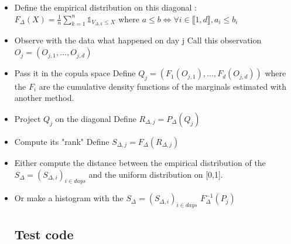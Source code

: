 \documentclass{article}
\begin{document}
\begin{itemize}
\item Define the empirical distribution on this diagonal : \newline
\newline
	\begin{math} F_\Delta (X) = \frac{1}{n} \sum_{k=1}^n \mathds{1}_{V_{\Delta ,k} \leq X} \end{math}
	\newline
	\newline
	where \begin{math} a \leq b \iff \forall i \in \llbracket 1,d \rrbracket,  a_i \leq b_i  \end{math}
	
\item Observe with the data what happened on day j \newline
		Call this observation $O_j = (O_{j,1},...,O_{j,d})$

\item Pass it in the copula space \newline
		Define \begin{math} Q_j = (F_1 (O_{j,1}),...,F_d (O_{j,d})) \end{math} \newline
		where the $F_i$ are the cumulative density functions of the marginals estimated with another method.
		
\item Project $Q_j$ on the diagonal \newline
		Define $R_{\Delta ,j} = P_\Delta (Q_j)$

\item Compute its "rank" \newline Define $S_{\Delta,j} = F_\Delta (R_{\Delta,j})  $ \newline

\item Either compute the distance between the empirical distribution of the $S_{\Delta}=(S_{\Delta,i})_{i \in days}$  and the uniform distribution on [0,1].

\item Or make a histogram with the $S_{\Delta}=(S_{\Delta,i})_{i \in days}$
	\begin{math} F_\Delta^{-1} (P_j) \end{math}
	
	\subsection{Test code}
	

\end{itemize}
\end{document}
